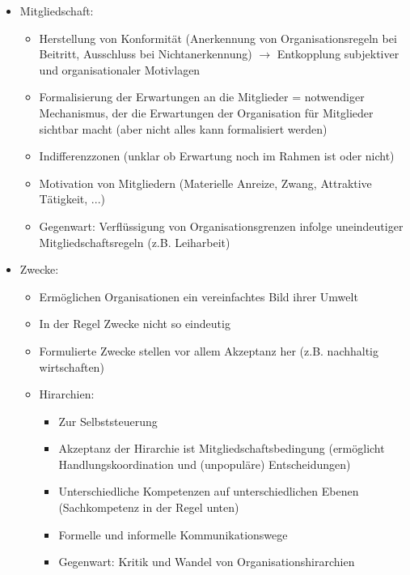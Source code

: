 \documentclass{scrartcl}
\begin{document}
\begin{itemize}
    \item
        Mitgliedschaft:
        \begin{itemize}
            \item
                Herstellung von Konformität (Anerkennung von Organisationsregeln bei Beitritt, Ausschluss bei Nichtanerkennung) $\rightarrow$ Entkopplung subjektiver und organisationaler Motivlagen
            \item
                Formalisierung der Erwartungen an die Mitglieder = notwendiger Mechanismus, der die Erwartungen der Organisation für Mitglieder sichtbar macht (aber nicht alles kann formalisiert werden)
            \item
                Indifferenzzonen (unklar ob Erwartung noch im Rahmen ist oder nicht)
            \item
                Motivation von Mitgliedern (Materielle Anreize, Zwang, Attraktive Tätigkeit, ...)
            \item
                Gegenwart: Verflüssigung von Organisationsgrenzen infolge uneindeutiger Mitgliedschaftsregeln (z.B. Leiharbeit)
        \end{itemize}
    \item
        Zwecke:
        \begin{itemize}
            \item
                Ermöglichen Organisationen ein vereinfachtes Bild ihrer Umwelt
            \item
                In der Regel Zwecke nicht so eindeutig
            \item
                Formulierte Zwecke stellen vor allem Akzeptanz her (z.B. nachhaltig wirtschaften)
    \item
        Hirarchien:
            \begin{itemize}
                \item
                    Zur Selbststeuerung
                \item
                    Akzeptanz der Hirarchie ist Mitgliedschaftsbedingung (ermöglicht Handlungskoordination und (unpopuläre) Entscheidungen)
                \item
                    Unterschiedliche Kompetenzen auf unterschiedlichen Ebenen (Sachkompetenz in der Regel unten)
                \item
                    Formelle und informelle Kommunikationswege
                \item
                    Gegenwart: Kritik und Wandel von Organisationshirarchien
            \end{itemize}
        \end{itemize}
\end{itemize}
\end{document}
